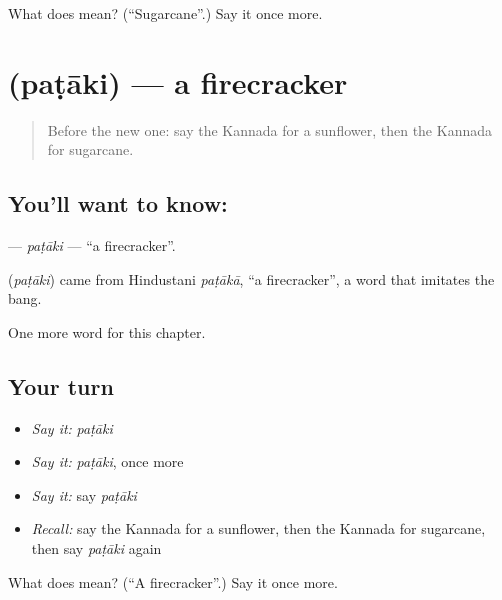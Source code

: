 \begin{tcolorbox}[breakable,colback=teal!4,colframe=teal!35!black,title={Before you move on}]
What does  mean? (\textquotedblleft{}Sugarcane\textquotedblright{}.) Say it once more.
\end{tcolorbox}
\section[\texorpdfstring{\kn{ಪಟಾಕಿ} (paṭāki)}{ಪಟಾಕಿ (paṭāki)}]{ (paṭāki) — a firecracker}

\label{lesson:KA-C225-pataki}



\begin{quote}
Before the new one: say the Kannada for a sunflower, then the Kannada for sugarcane.
\end{quote}

\subsection*{You'll want to know: }
\textbf{} — \emph{paṭāki} — \textquotedblleft{}a firecracker\textquotedblright{}.

\begin{cousinweb}
\textbf{} (\emph{paṭāki}) came from Hindustani \emph{paṭākā}, \textquotedblleft{}a firecracker\textquotedblright{}, a word that imitates the bang.
\end{cousinweb}

\begin{grammarlens}[title={What you've built}]
One more word for this chapter.
\end{grammarlens}

\subsection*{Your turn}
\begin{itemize}
\raggedright
  \item \emph{Say it:} \emph{paṭāki}
  \item \emph{Say it:} \emph{paṭāki}, once more
  \item \emph{Say it:} say \emph{paṭāki}
  \item \emph{Recall:} say the Kannada for a sunflower, then the Kannada for sugarcane, then say \emph{paṭāki} again
\end{itemize}

\begin{tcolorbox}[breakable,colback=teal!4,colframe=teal!35!black,title={Before you move on}]
What does  mean? (\textquotedblleft{}A firecracker\textquotedblright{}.) Say it once more.
\end{tcolorbox}
